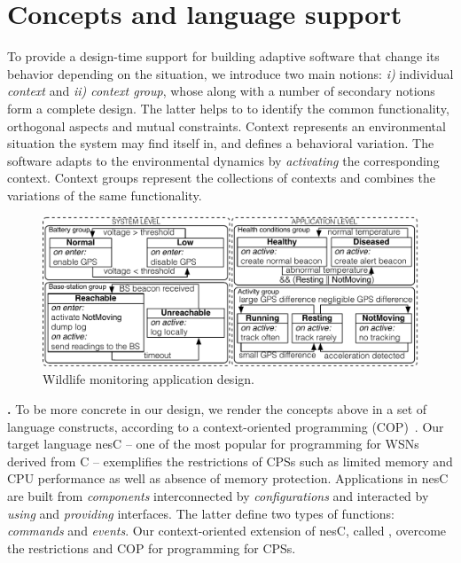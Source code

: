 \section{Concepts and language support}

To provide a design-time support for building adaptive software that change its
behavior depending on the situation, we introduce two main notions:
\emph{i)} individual \emph{context} and \emph{ii) context group}, whose along
with a number of secondary notions form a complete design. The latter helps to
to identify the common functionality, orthogonal aspects and mutual constraints.
Context represents an environmental situation the system may find itself in, and
defines a behavioral variation. The software adapts to the
environmental dynamics by \emph{activating} the corresponding context. Context
groups represent the collections of contexts and combines the
variations of the same functionality.

\begin{figure}
\begin{center}
\includegraphics[scale=.45]{imgs/wildlifetracking}
\vspace{-1mm}
\caption{Wildlife monitoring application design.}
  \label{fig:design}
\vspace{-9mm}
\end{center}
\end{figure}

{\bf \conesc.} To be more concrete in our design, we render the concepts above
in a set of language constructs, according to a context-oriented programming
(COP)~\cite{Hirschfeld08}. Our target language nesC -- one of the most popular
for programming for WSNs derived from C -- exemplifies the restrictions of CPSs
such as limited memory and CPU performance as well as absence of memory
protection. Applications in nesC are built from \emph{components} interconnected
by \emph{configurations} and interacted by \emph{using} and \emph{providing}
interfaces. The latter define two types of functions: \emph{commands} and
\emph{events}. Our context-oriented extension of nesC, called \conesc, overcome
the restrictions and COP for programming for CPSs.

